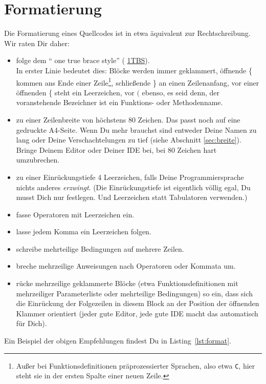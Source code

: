 \documentclass[twoside]{scrreprt}
\providecommand{\code}[1]{\texttt{#1}}
\begin{document}
\section{Formatierung\label{sec:format}}
Die Formatierung eines Quellcodes ist in etwa \"a{}quivalent zur
Rechtschreibung. Wir raten Dir daher:
\begin{itemize}
\item folge dem "` one true brace style"' (%
\href{http://en.wikipedia.org/wiki/Indent_style#Variant:_1TBS}{1TBS}).\\
  In erster Linie bedeutet dies: Bl\"o{}cke werden immer geklammert,
  \"o{}ffnende \{ kommen ans Ende einer
      Zeile\footnote{Au\ss{}er bei Funktionsdefinitionen pr\"a{}prozessierter
      Sprachen, also etwa \code{C}, hier steht sie in der ersten Spalte einer
  neuen Zeile.}, schlie\ss{}ende \} an einen Zeilenanfang, 
      vor einer
  \"o{}ffnenden \{ steht ein Leerzeichen, vor $($ ebenso, es seid denn,
  der voranstehende Bezeichner ist ein Funktions- oder Methodenname.
\item zu einer Zeilenbreite von h\"o{}chstens 80 Zeichen. Das passt
  noch auf eine gedruckte A4-Seite. Wenn Du mehr brauchst sind
  entweder Deine Namen zu lang oder Deine Verschachtelungen zu
  tief (siehe Abschnitt \ref{sec:breite}).
  Bringe Deinem Editor oder Deiner IDE bei, bei 80 Zeichen hart
  umzubrechen.
\item zu einer Einr\"u{}ckungstiefe 4 Leerzeichen, falls Deine
  Programmiersprache nichts anderes \emph{erzwingt}.
  (Die Einr\"u{}ckungstiefe ist eigentlich v\"o{}llig egal, Du
  musst Dich nur festlegen. Und Leerzeichen statt
  Tabulatoren verwenden.)
\item fasse Operatoren mit Leerzeichen ein.
\item lasse jedem Komma ein Leerzeichen folgen.
\item schreibe mehrteilige Bedingungen auf mehrere Zeilen.
\item breche mehrzeilige Anweisungen nach Operatoren oder Kommata um.
\item r\"u{}cke mehrzeilige geklammerte Bl\"o{}cke (etwa Funktionsdefinitionen 
    mit mehrzeiliger Parameterliste oder mehrteilige Bedingungen) so ein, dass 
    sich die Einr\"u{}ckung der Folgezeilen in diesem Block an der Position der
    \"o{}ffnenden Klammer orientiert (jeder gute Editor, jede gute IDE macht das
    automatisch f\"u{}r Dich).
\end{itemize}
Ein Beispiel der obigen Empfehlungen 
findest Du in Listing~\ref{lst:format}.

\end{document}
